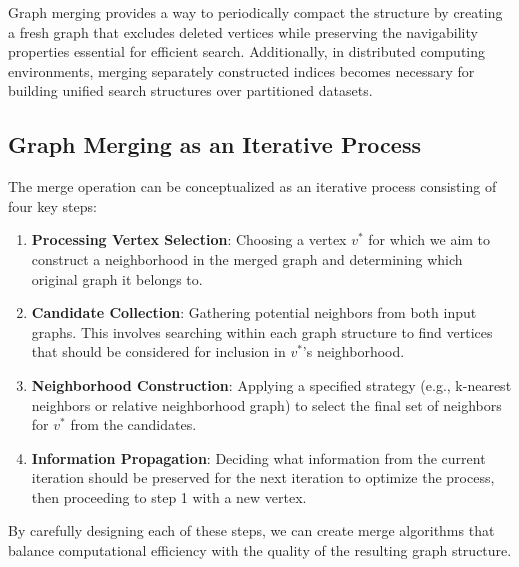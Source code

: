 \documentclass{article}
\begin{document}
Graph merging provides a way to periodically compact the structure by creating a fresh graph that excludes deleted vertices while preserving the navigability properties essential for efficient search. Additionally, in distributed computing environments, merging separately constructed indices becomes necessary for building unified search structures over partitioned datasets.

\subsection{Graph Merging as an Iterative Process}

The merge operation can be conceptualized as an iterative process consisting of four key steps:

\begin{enumerate}
    \item \textbf{Processing Vertex Selection}: Choosing a vertex $v^*$ for which we aim to construct a neighborhood in the merged graph and determining which original graph it belongs to.
   
    \item \textbf{Candidate Collection}: Gathering potential neighbors from both input graphs. This involves searching within each graph structure to find vertices that should be considered for inclusion in $v^*$'s neighborhood.
   
    \item \textbf{Neighborhood Construction}: Applying a specified strategy (e.g., k-nearest neighbors or relative neighborhood graph) to select the final set of neighbors for $v^*$ from the candidates.
   
    \item \textbf{Information Propagation}: Deciding what information from the current iteration should be preserved for the next iteration to optimize the process, then proceeding to step 1 with a new vertex.
\end{enumerate}

By carefully designing each of these steps, we can create merge algorithms that balance computational efficiency with the quality of the resulting graph structure. 
\end{document}
